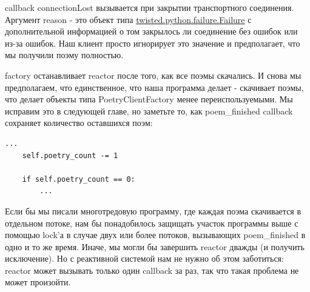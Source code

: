 callback connectionLost вызывается при закрытии транспортного соединения. 
Аргумент reason - это объект типа 
\href{http://twistedmatrix.com/trac/browser/tags/releases/twisted-8.2.0/twisted/python/failure.py}{twisted.python.failure.Failure} 
с дополнительной информацией о том закрылось ли соединение без ошибок 
или из-за ошибок. Наш клиент просто игнорирует это значение и предполагает, 
что мы получили поэму полностью.


factory останавливает reactor после того, как все поэмы скачались. 
И снова мы предполагаем, что единственное, что наша программа 
делает - скачивает поэмы, что делает объекты типа PoetryClientFactory 
менее переиспользуемыми. Мы исправим это в следующей главе, но заметьте 
то, как poem\_finished callback сохраняет количество оставшихся поэм:

\begin{scriptsize}\begin{verbatim}
...
    self.poetry_count -= 1

    if self.poetry_count == 0:
        ...
\end{verbatim}\end{scriptsize}


Если бы мы писали многотредовую программу, где каждая 
поэма скачивается в отдельном потоке, нам бы 
понадобилось защищать участок программы выше с помощью 
lock'а в случае двух или более потоков, вызывающих 
poem\_finished в одно и то же время. Иначе, мы могли бы 
завершить reactor дважды (и получить исключение). Но с 
реактивной системой нам не нужно об этом заботиться: reactor 
может вызывать только один callback за раз, так что такая  
проблема не может произойти.

